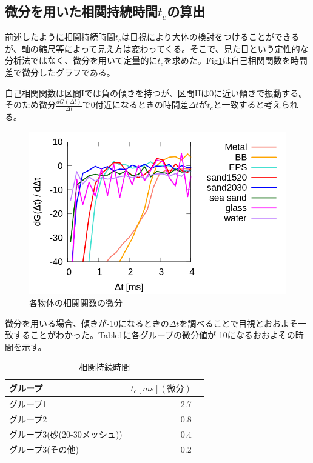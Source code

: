 \documentclass[a4paper,10pt,twocolumn,dvipdfmx]{jsarticle}
\newcommand{\Dt}{\Delta t}
\newcommand{\II}{I\hspace{-.1em}I}
\begin{document}
\subsection{微分を用いた相関持続時間$t_c$の算出}
前述したように相関持続時間$t_c$は目視により大体の検討をつけることができるが、軸の縮尺等によって見え方は変わってくる。そこで、見た目という定性的な分析法ではなく、微分を用いて定量的に$t_c$を求めた。Fig\ref{fig:diff}は自己相関関数を時間差で微分したグラフである。 \par
自己相関関数は区間Iでは負の傾きを持つが、区間\II は0に近い傾きで振動する。そのため微分$\frac{dG(\Dt)}{\Dt}$で0付近になるときの時間差$\Dt がt_c$と一致すると考えられる。
\begin{figure}[H]
	\includegraphics[scale=0.4]{diff.png}
	\caption{各物体の相関関数の微分}
	\label{fig:diff}
\end{figure}
微分を用いる場合、傾きが-10になるときの$\Dt$を調べることで目視とおおよそ一致することがわかった。Table\ref{tb:tc_diff}に各グループの微分値が-10になるおおよその時間を示す。
\begin{table}[H]
	\caption{相関持続時間 \label{tb:tc_diff}}
	\begin{tabular}{lrr}
		\toprule
		グループ & $t_c [ms](微分)$  \\
		\midrule
		グループ1 & 2.7  \\
		グループ2 & 0.8  \\
		グループ3(砂(20-30メッシュ)) & 0.4  \\
		グループ3(その他) & 0.2 \\
		\bottomrule
	\end{tabular}
\end{table}
\end{document}
